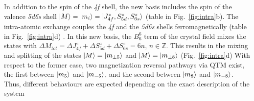 \documentclass[
reprint,amsmath,amssymb,aps]{revtex4-2}
\begin{document}
In addition to the spin of the \textit{4f} shell, the new basis includes the spin of the valence \textit{5d6s} shell $\ket{M}=\ket{m_i}=\ket{J_{4f}^z,S_{5d}^z,S_{6s}^z}$ (table in Fig.~\ref{fig:intra}b). The intra-atomic exchange couples the \textit{4f} and the \textit{5d6s} shells ferromagnetically (table in Fig.~\ref{fig:intra}d) \cite{pivettaMeasuringIntraAtomicExchange2020}. 
In this new basis, the $B_6^6$ term of the crystal field mixes the states with $\Delta M_{tot}=\Delta J_{4f}^z + \Delta S_{5d}^z + \Delta S_{6s}^z=6n$, $n\in \mathbb{Z}$. This results in the mixing and splitting of the states $\ket{M}=\ket{m_{\pm 5}}$ and $\ket{M}=\ket{m_{\pm 8}}$ (Fig.~\ref{fig:intra}d)
With respect to the former case, two magnetization reversal pathways via QTM exist, the first between $\ket{m_{5}}$ and $\ket{m_{-5}}$, and the second between $\ket{m_{8}}$ and $\ket{m_{-8}}$. Thus, different behaviours are expected depending on the exact description of the system
\end{document}

